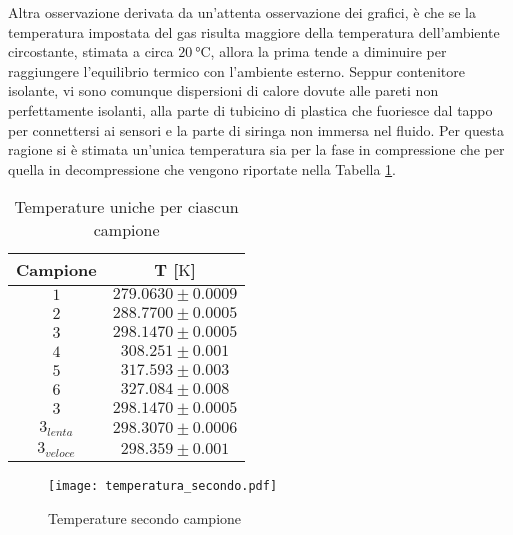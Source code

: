\documentclass[a4paper,11pt,oneside]{article}
\begin{document}
Altra osservazione derivata da un'attenta osservazione dei grafici, è che se la temperatura impostata del gas risulta maggiore della temperatura dell'ambiente circostante, stimata a circa $\SI{20}{\celsius}$, allora la prima tende a diminuire per raggiungere l'equilibrio termico con l'ambiente esterno. Seppur contenitore isolante, vi sono comunque dispersioni di calore dovute alle pareti non perfettamente isolanti, alla parte di tubicino di plastica che fuoriesce dal tappo per connettersi ai sensori e la parte di siringa non immersa nel fluido. Per questa ragione si è stimata un'unica temperatura sia per la fase in compressione che per quella in decompressione che vengono riportate nella Tabella \ref{tab:temp_unica}. 

\begin{table}[h!]
    \centering
    \begin{tabular}{|c|c|}
        \hline
        \textbf{Campione} & \textbf{T} [$\si{\kelvin}$] \\ \hline
        \rowcolor[rgb]{0.85,0.85,0.85}$1$ & $279.0630\pm0.0009$ \\ \hline
        $2$ & $288.7700\pm0.0005$ \\ \hline
        \rowcolor[rgb]{0.85,0.85,0.85}$3$ & $298.1470\pm0.0005$ \\ \hline
        $4$ & $308.251\pm0.001$ \\ \hline
        \rowcolor[rgb]{0.85,0.85,0.85}$5$ & $317.593\pm0.003$ \\ \hline
        $6$ & $327.084\pm0.008$ \\ \hline \hline
        \rowcolor[rgb]{0.85,0.85,0.85}$3$ & $298.1470\pm0.0005$ \\ \hline
        $3_{lenta}$ & $298.3070\pm0.0006$ \\ \hline
        \rowcolor[rgb]{0.85,0.85,0.85}$3_{veloce}$ & $298.359\pm0.001$ \\ \hline
    \end{tabular}
    \caption{Temperature uniche per ciascun campione}
    \label{tab:temp_unica}
\end{table}


\begin{figure}[h!]
    \centering
    \texttt{[image: temperatura\_secondo.pdf]}
    \caption{Temperature secondo campione}
    \label{fig:campione2}
\end{figure}

\end{document}
